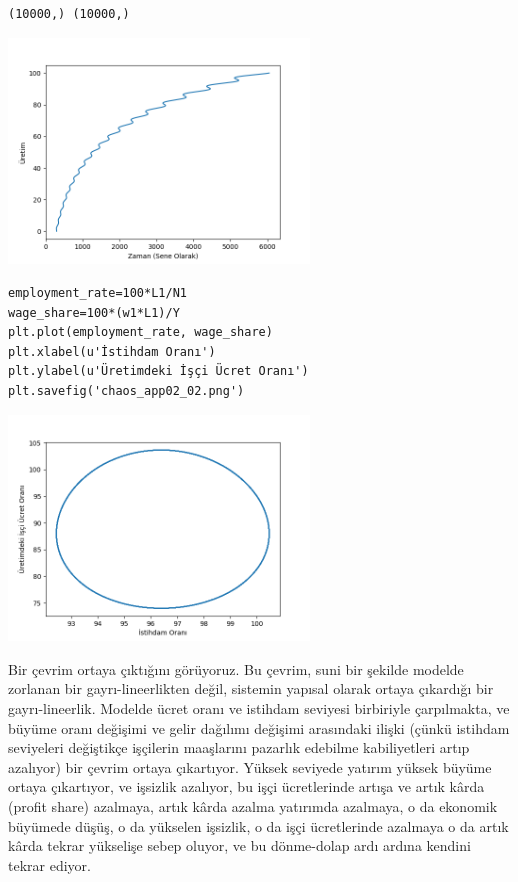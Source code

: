 \documentclass[12pt,fleqn]{article}\usepackage{../../common}
\begin{document}
\begin{verbatim}
(10000,) (10000,)
\end{verbatim}

\includegraphics[height=6cm]{chaos_app02_01.png}

\begin{verbatim}
employment_rate=100*L1/N1
wage_share=100*(w1*L1)/Y
plt.plot(employment_rate, wage_share)
plt.xlabel(u'İstihdam Oranı')
plt.ylabel(u'Üretimdeki İşçi Ücret Oranı')
plt.savefig('chaos_app02_02.png')
\end{verbatim}

\includegraphics[height=6cm]{chaos_app02_02.png}

Bir çevrim ortaya çıktığını görüyoruz. Bu çevrim, suni bir şekilde modelde
zorlanan bir gayrı-lineerlikten değil, sistemin yapısal olarak ortaya
çıkardığı bir gayrı-lineerlik. Modelde ücret oranı ve istihdam seviyesi
birbiriyle çarpılmakta, ve büyüme oranı değişimi ve gelir dağılımı değişimi
arasındaki ilişki (çünkü istihdam seviyeleri değiştikçe işçilerin
maaşlarını pazarlık edebilme kabiliyetleri artıp azalıyor) bir çevrim
ortaya çıkartıyor. Yüksek seviyede yatırım yüksek büyüme ortaya çıkartıyor,
ve işsizlik azalıyor, bu işçi ücretlerinde artışa ve artık kârda (profit
share) azalmaya, artık kârda azalma yatırımda azalmaya, o da ekonomik
büyümede düşüş, o da yükselen işsizlik, o da işçi ücretlerinde azalmaya o
da artık kârda tekrar yükselişe sebep oluyor, ve bu dönme-dolap ardı ardına
kendini tekrar ediyor.
\end{document}
